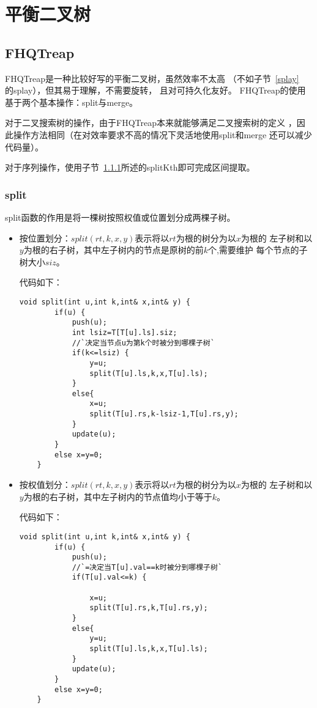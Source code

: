\section{平衡二叉树}
\subsection{FHQTreap}\label{FHQTreap}
FHQTreap是一种比较好写的平衡二叉树，虽然效率不太高
（不如子节~\ref{splay}\\的splay），但其易于理解，不需要旋转，
且对可持久化友好。
FHQTreap的使用基于两个基本操作：split与merge。

对于二叉搜索树的操作，由于FHQTreap本来就能够满足二叉搜索树的定义
，因此操作方法相同（在对效率要求不高的情况下灵活地使用split和merge
还可以减少代码量）。

对于序列操作，使用子节~\ref{split}所述的splitKth即可完成区间提取。

\subsubsection{split}\label{split}

split函数的作用是将一棵树按照权值或位置划分成两棵子树。

\begin{itemize}
\item
按位置划分：$split(rt,k,x,y)$表示将以$rt$为根的树分为以$x$为根的
左子树和以$y$为根的右子树，其中左子树内的节点是原树的前$k$个,需要维护
每个节点的子树大小$siz$。

代码如下：
\begin{lstlisting}[title=splitKth]
    void split(int u,int k,int& x,int& y) {
        if(u) {
            push(u);
            int lsiz=T[T[u].ls].siz;
            //`决定当节点u为第k个时被分到哪棵子树`
            if(k<=lsiz) {
                y=u;
                split(T[u].ls,k,x,T[u].ls);
            }
            else{
                x=u;
                split(T[u].rs,k-lsiz-1,T[u].rs,y);
            }
            update(u);
        }
        else x=y=0;
    }
\end{lstlisting}
\item
按权值划分：$split(rt,k,x,y)$表示将以$rt$为根的树分为以$x$为根的
左子树和以$y$为根的右子树，其中左子树内的节点值均小于等于$k$。

代码如下：
\begin{lstlisting}[title=splitKey]
    void split(int u,int k,int& x,int& y) {
        if(u) {
            push(u);
            //`=决定当T[u].val==k时被分到哪棵子树`
            if(T[u].val<=k) {

                x=u;
                split(T[u].rs,k,T[u].rs,y);
            }
            else{
                y=u;
                split(T[u].ls,k,x,T[u].ls);
            }
            update(u);
        }
        else x=y=0;
    }
\end{lstlisting}
\end{itemize}

